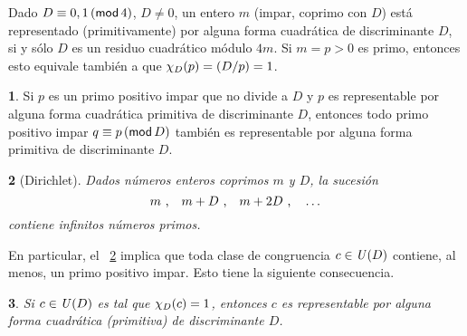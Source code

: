 \theoremstyle{plain}
\newtheorem{teoMotivaGeneros}{\teoname}[section]
\newtheorem{coroMotivaGeneros}[teoMotivaGeneros]{\coroname}

\theoremstyle{definition}
\newtheorem{obsMotivaGeneros}[teoMotivaGeneros]{\obsname}


% 
Dado $D\equiv 0,1\tmodulo[4]$, $D\neq 0$, un entero
$m$ (impar, coprimo con $D$) est\'a representado
(primitivamente) por alguna forma cuadr\'atica de
discriminante $D$, si y s\'olo $D$ es un residuo
cuadr\'atico m\'odulo $4m$. Si $m=p>0$ es primo,
entonces esto equivale tambi\'en a que
$\varkronecker[D](p)=\tlegendre D p=1$.

\begin{obsMotivaGeneros}\label{obs:motiva:generos}
	Si $p$ es un primo positivo impar que no divide
	a $D$ y $p$ es representable por alguna forma
	cuadr\'atica primitiva de discriminante $D$,
	entonces todo primo positivo impar
	$q\equiv p\tmodulo[D]$ tambi\'en es
	representable por alguna forma primitiva
	de discriminante $D$.
\end{obsMotivaGeneros}

\begin{teoMotivaGeneros}[Dirichlet]\label{teo:motiva:generos}
	Dados n\'umeros enteros coprimos $m$ y $D$, la
	sucesi\'on
	\begin{displaymath}
		m\dispcomma\quad
		m+D\dispcomma\quad
		m+2 D\dispcomma\quad\dots
	\end{displaymath}
	contiene infinitos n\'umeros primos.
\end{teoMotivaGeneros}

En particular, el \teoname~\ref{teo:motiva:generos}
implica que toda clase de congruencia $c\in\Unidadesmod(D)$
contiene, al menos, un primo positivo impar. Esto
tiene la siguiente consecuencia.

\begin{coroMotivaGeneros}\label{coro:motiva:generos}
	Si $c\in\Unidadesmod(D)$ es tal que
	$\varkronecker[D](c)=1$, entonces $c$ es representable
	por alguna forma cuadr\'atica (primitiva) de
	discriminante $D$.
\end{coroMotivaGeneros}

